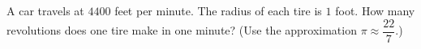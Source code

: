 A car travels at $4400$ feet per minute. The radius of each tire is $1$ foot. How many revolutions does one tire make in one minute? (Use the approximation $\pi\approx\dfrac{22}{7}$.)
